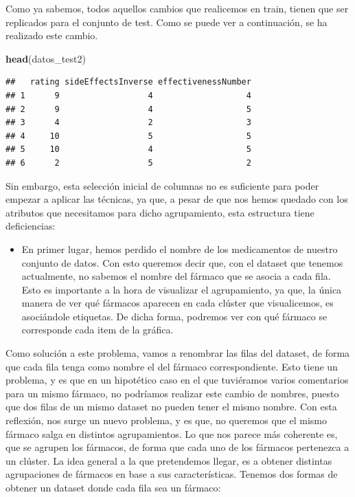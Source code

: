\documentclass[spanish,]{article}
\newenvironment{Shaded}{\begin{snugshade}}{\end{snugshade}}
\newcommand{\KeywordTok}[1]{\textcolor[rgb]{0.13,0.29,0.53}{\textbf{#1}}}
\newcommand{\NormalTok}[1]{#1}
\providecommand{\tightlist}{%
  \setlength{\itemsep}{0pt}\setlength{\parskip}{0pt}}
\begin{document}
Como ya sabemos, todos aquellos cambios que realicemos en train, tienen
que ser replicados para el conjunto de test. Como se puede ver a
continuación, se ha realizado este cambio.

\begin{Shaded}
\begin{Highlighting}[]
\KeywordTok{head}\NormalTok{(datos_test2)}
\end{Highlighting}
\end{Shaded}

\begin{verbatim}
##   rating sideEffectsInverse effectivenessNumber
## 1      9                  4                   4
## 2      9                  4                   5
## 3      4                  2                   3
## 4     10                  5                   5
## 5     10                  4                   5
## 6      2                  5                   2
\end{verbatim}

Sin embargo, esta selección inicial de columnas no es suficiente para
poder empezar a aplicar las técnicas, ya que, a pesar de que nos hemos
quedado con los atributos que necesitamos para dicho agrupamiento, esta
estructura tiene deficiencias:

\begin{itemize}
\tightlist
\item
  En primer lugar, hemos perdido el nombre de los medicamentos de
  nuestro conjunto de datos. Con esto queremos decir que, con el dataset
  que tenemos actualmente, no sabemos el nombre del fármaco que se
  asocia a cada fila. Esto es importante a la hora de visualizar el
  agrupamiento, ya que, la única manera de ver qué fármacos aparecen en
  cada clúster que visualicemos, es asociándole etiquetas. De dicha
  forma, podremos ver con qué fármaco se corresponde cada item de la
  gráfica.
\end{itemize}

Como solución a este problema, vamos a renombrar las filas del dataset,
de forma que cada fila tenga como nombre el del fármaco correspondiente.
Esto tiene un problema, y es que en un hipotético caso en el que
tuviéramos varios comentarios para un mismo fármaco, no podríamos
realizar este cambio de nombres, puesto que dos filas de un mismo
dataset no pueden tener el mismo nombre. Con esta reflexión, nos surge
un nuevo problema, y es que, no queremos que el mismo fármaco salga en
distintos agrupamientos. Lo que nos parece más coherente es, que se
agrupen los fármacos, de forma que cada uno de los fármacos pertenezca a
un clúster. La idea general a la que pretendemos llegar, es a obtener
distintas agrupaciones de fármacos en base a sus características.
Tenemos dos formas de obtener un dataset donde cada fila sea un fármaco:
\end{document}
